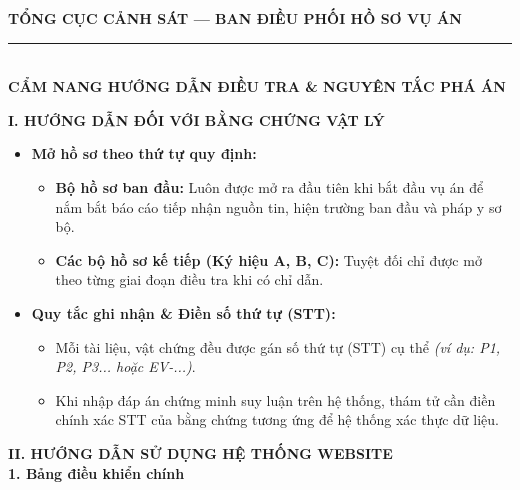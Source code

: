 \documentclass[12pt,a4paper]{article}
\begin{document}
\begin{center}
    \fontsize{12pt}{14pt}\selectfont
    \textbf{TỔNG CỤC CẢNH SÁT — BAN ĐIỀU PHỐI HỒ SƠ VỤ ÁN}\\[-0.2em]
    \rule{6cm}{0.6pt}\\[0.5cm]
    \textbf{\Large CẨM NANG HƯỚNG DẪN ĐIỀU TRA \& NGUYÊN TẮC PHÁ ÁN}\\[0.15cm]
    \textit{}
\end{center}
\vspace{0.3cm}



\vspace{0.3cm}\noindent\textbf{\large I. HƯỚNG DẪN ĐỐI VỚI BẰNG CHỨNG VẬT LÝ}\\[0.15cm]


\begin{itemize}[leftmargin=*, itemsep=2pt, topsep=2pt, parsep=0pt]
  \item \textbf{Mở hồ sơ theo thứ tự quy định:}
\begin{itemize}[leftmargin=*, itemsep=2pt, topsep=2pt, parsep=0pt]
  \item \textbf{Bộ hồ sơ ban đầu:} Luôn được mở ra đầu tiên khi bắt đầu vụ  án để nắm bắt báo cáo tiếp nhận nguồn tin, hiện trường ban đầu và pháp y sơ bộ.
  \item \textbf{Các bộ hồ sơ kế tiếp (Ký hiệu A, B, C):} Tuyệt đối chỉ được mở theo từng giai đoạn điều tra khi có chỉ dẫn.

\end{itemize}
  \item \textbf{Quy tắc ghi nhận \& Điền số thứ tự (STT):}
\begin{itemize}[leftmargin=*, itemsep=2pt, topsep=2pt, parsep=0pt]
  \item Mỗi tài liệu, vật chứng đều được gán số thứ tự (STT) cụ thể \textit{(ví dụ: P1, P2, P3... hoặc EV-...)}.
  \item Khi nhập đáp án chứng minh suy luận trên hệ thống, thám tử cần điền chính xác STT của bằng chứng tương ứng để hệ thống xác thực dữ liệu.


\end{itemize}
\end{itemize}

\vspace{0.3cm}\noindent\textbf{\large II. HƯỚNG DẪN SỬ DỤNG HỆ THỐNG WEBSITE}\\[0.15cm]



\vspace{0.2cm}\noindent\textbf{1. Bảng điều khiển chính}\\[0.1cm]
\end{document}

